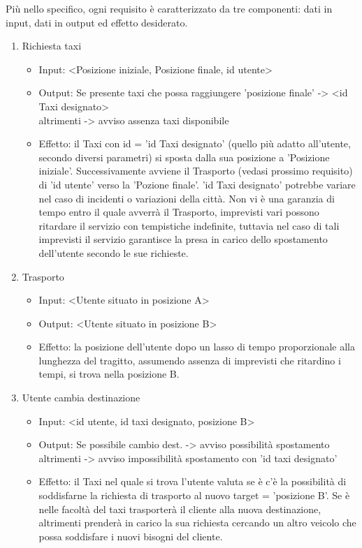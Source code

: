 Più nello specifico, ogni requisito è caratterizzato da tre componenti: dati in input, dati in output ed effetto desiderato.

\begin{enumerate}
	\item Richiesta taxi
		\begin{itemize}
			\item Input:  <Posizione iniziale, Posizione finale, id utente>
			\item Output: Se presente taxi che possa raggiungere 'posizione finale' -> <id Taxi designato> \\
						  altrimenti -> avviso assenza taxi disponibile
			\item Effetto: il Taxi con id = 'id Taxi designato' (quello più adatto all'utente, secondo diversi parametri) si sposta dalla sua posizione a 'Posizione iniziale'. Successivamente avviene il Trasporto (vedasi prossimo requisito) di 'id utente' verso la 'Pozione finale'. 'id Taxi designato' potrebbe variare nel caso di incidenti o variazioni della città. Non vi è una garanzia di tempo entro il quale avverrà il Trasporto, imprevisti vari possono ritardare il servizio con tempistiche indefinite, tuttavia nel caso di tali imprevisti il servizio garantisce la presa in carico dello spostamento dell'utente secondo le sue richieste.
		\end{itemize}

	\item Trasporto
		\begin{itemize}
			\item Input:  <Utente situato in posizione A>
			\item Output: <Utente situato in posizione B>
			\item Effetto: la posizione dell'utente dopo un lasso di tempo proporzionale alla lunghezza del tragitto, assumendo assenza di imprevisti che ritardino i tempi, si trova nella posizione B.
		\end{itemize}

	\item Utente cambia destinazione
		\begin{itemize}
			\item Input: <id utente, id taxi designato, posizione B>
			\item Output: Se possibile cambio dest. -> avviso possibilità spostamento \\
						  altrimenti -> avviso impossibilità spostamento con 'id taxi designato'
			\item Effetto: il Taxi nel quale si trova l'utente valuta se è c'è la possibilità di soddisfarne la richiesta di trasporto al nuovo target = 'posizione B'. Se è nelle facoltà del taxi trasporterà il cliente alla nuova destinazione, altrimenti prenderà in carico la sua richiesta cercando un altro veicolo che possa soddisfare i nuovi bisogni del cliente.
		\end{itemize}
	

\end{enumerate}

